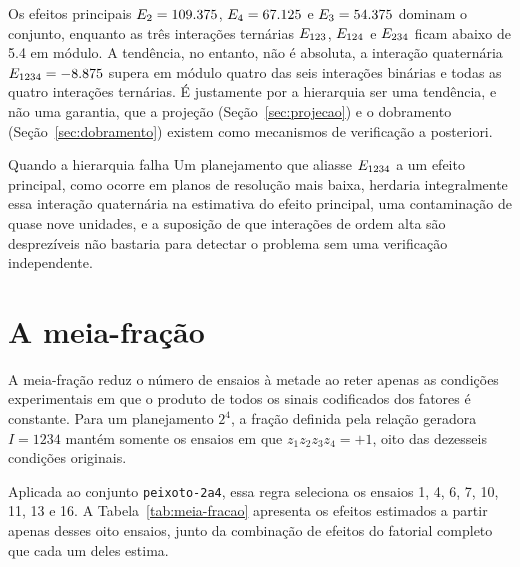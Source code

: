 \documentclass{doeapostila}
\begin{document}
Os efeitos principais $E_{2} = \num{109.375}$, $E_{4} =
\num{67.125}$ e $E_{3} = \num{54.375}$ dominam o conjunto, enquanto as
três interações ternárias $E_{123}$, $E_{124}$ e $E_{234}$
ficam abaixo de \num{5.4} em módulo. A tendência, no entanto, não é absoluta,
a interação quaternária $E_{1234} = \num{-8.875}$ supera em módulo quatro
das seis interações binárias e todas as quatro interações ternárias. É
justamente por a hierarquia ser uma tendência, e não uma garantia, que a
projeção (Seção~\ref{sec:projecao}) e o dobramento (Seção~\ref{sec:dobramento})
existem como mecanismos de verificação a posteriori.

\begin{aplicacao}{Quando a hierarquia falha}
  Um planejamento que aliasse $E_{1234}$ a um efeito principal, como
  ocorre em planos de resolução mais baixa, herdaria integralmente essa
  interação quaternária na estimativa do efeito principal, uma contaminação
  de quase nove unidades, e a suposição de que interações de ordem alta são
  desprezíveis não bastaria para detectar o problema sem uma verificação
  independente.
\end{aplicacao}

\section{A meia-fração}
\label{sec:meia-fracao}

A meia-fração reduz o número de ensaios à metade ao reter apenas as
condições experimentais em que o produto de todos os sinais codificados dos
fatores é constante. Para um planejamento $2^{4}$, a fração definida pela
relação geradora $I = 1234$ mantém somente os ensaios em que
$z_{1}z_{2}z_{3}z_{4} = +1$, oito das dezesseis condições originais.

Aplicada ao conjunto \texttt{peixoto-2a4}, essa regra seleciona os ensaios 1,
4, 6, 7, 10, 11, 13 e 16. A Tabela~\ref{tab:meia-fracao} apresenta os efeitos
estimados a partir apenas desses oito ensaios, junto da combinação de efeitos
do fatorial completo que cada um deles estima.
\end{document}
